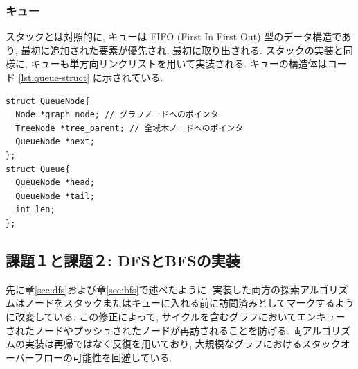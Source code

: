 \documentclass[a4j, 12pt]{jarticle}
\begin{document}
\subsubsection{キュー}
スタックとは対照的に, キューは FIFO (First In First Out) 型のデータ構造であり, 最初に追加された要素が優先され, 最初に取り出される. スタックの実装と同様に, キューも単方向リンクリストを用いて実装される. キューの構造体はコード \ref{lst:queue-struct} に示されている.

\begin{lstlisting}[caption=キューの構造,label=lst:queue-struct]
struct QueueNode{
  Node *graph_node; // グラフノードへのポインタ
  TreeNode *tree_parent; // 全域木ノードへのポインタ
  QueueNode *next;
};
struct Queue{
  QueueNode *head;
  QueueNode *tail;
  int len;
};
\end{lstlisting}
\subsection{課題１と課題２: DFSとBFSの実装}
先に章\ref{sec:dfs}および章\ref{sec:bfs}で述べたように, 実装した両方の探索アルゴリズムはノードをスタックまたはキューに入れる前に訪問済みとしてマークするように改変している. この修正によって, サイクルを含むグラフにおいてエンキューされたノードやプッシュされたノードが再訪されることを防げる. 両アルゴリズムの実装は再帰ではなく反復を用いており, 大規模なグラフにおけるスタックオーバーフローの可能性を回避している.
\end{document}
